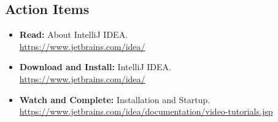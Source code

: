 \documentclass[11pt]{article}
\begin{document}
\subsection*{Action Items}

\begin{itemize}
\item \textbf{Read:} About IntelliJ IDEA. \\
\url{https://www.jetbrains.com/idea/}
\item \textbf{Download and Install:} IntelliJ IDEA. \\
\url{https://www.jetbrains.com/idea/}
\item \textbf{Watch and Complete:} Installation and Startup. \\
\url{https://www.jetbrains.com/idea/documentation/video-tutorials.jsp}
\end{itemize}
\end{document}
